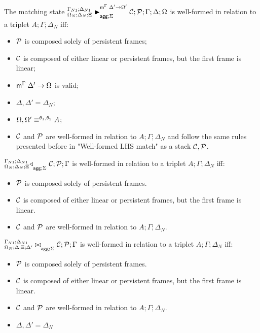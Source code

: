 \begin{definition}
The matching state $\matstatea{\Delta_N}{\lstack{C};
      \lstack{P}}{\Gamma}{\Delta}{\Omega}{\Delta' \rightarrow
         \Omega'}{\Sigma}$
is well-formed in relation to a triplet $A; \Gamma; \Delta_{N}$ iff:

\begin{itemize}[leftmargin=*]
   \item $\lstack{P}$ is composed solely of persistent frames;
   \item $\lstack{C}$ is composed of either linear or persistent frames, but the first
   frame is linear;
   \item $\mz{\Gamma}{\Delta'}{\Omega}$ is valid;
   \item $\Delta, \Delta' = \Delta_{N}$;
   \item $\feq{\Omega, \Omega'}{A}$;
   \item $\lstack{C}$ and $\lstack{P}$ are well-formed in relation to $A; \Gamma; \Delta_{N}$ and
   follow the same rules presented before in "Well-formed LHS match" as a stack
   $\lstack{C}, \lstack{P}$.
\end{itemize}
\end{definition}


\begin{definition}
$\contstatea{\Delta_N}{\lstack{C} ; \lstack{P}}{\Gamma}{\Sigma}$ is well-formed
in relation to a triplet $A; \Gamma; \Delta_{N}$ iff:

\begin{itemize}[leftmargin=*]
   \item $\lstack{P}$ is composed solely of persistent frames.
   \item $\lstack{C}$ is composed of either linear or persistent frames, but the first
   frame is linear.
   \item $\lstack{C}$ and $\lstack{P}$ are well-formed in relation to $A; \Gamma; \Delta_{N}$.
\end{itemize}
\end{definition}

\begin{definition}
$\fixstatea{\Delta}{\Xi; \Delta'}{\lstack{C}; \lstack{P}}{\Gamma}{\Sigma}$ is
well-formed in relation to a triplet $A; \Gamma; \Delta_{N}$ iff:

\begin{itemize}[leftmargin=*]
   \item $\lstack{P}$ is composed solely of persistent frames.
   \item $\lstack{C}$ is composed of either linear or persistent frames, but the first
   frame is linear.
   \item $\lstack{C}$ and $\lstack{P}$ are well-formed in relation to $A; \Gamma; \Delta_{N}$.
   \item $\Delta, \Delta' = \Delta_{N}$
\end{itemize}
\end{definition}

